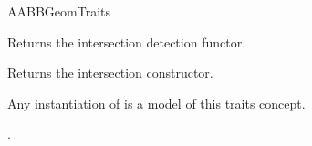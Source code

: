 \begin{ccRefConcept}{AABBGeomTraits}
\ccCreation
{}  %


\ccOperations

{Returns the intersection detection functor.}

{Returns the intersection constructor.}

\ccHasModels
Any instantiation of  is a model of this traits concept.

\ccSeeAlso

.


\end{ccRefConcept}

\ccRefPageEnd

